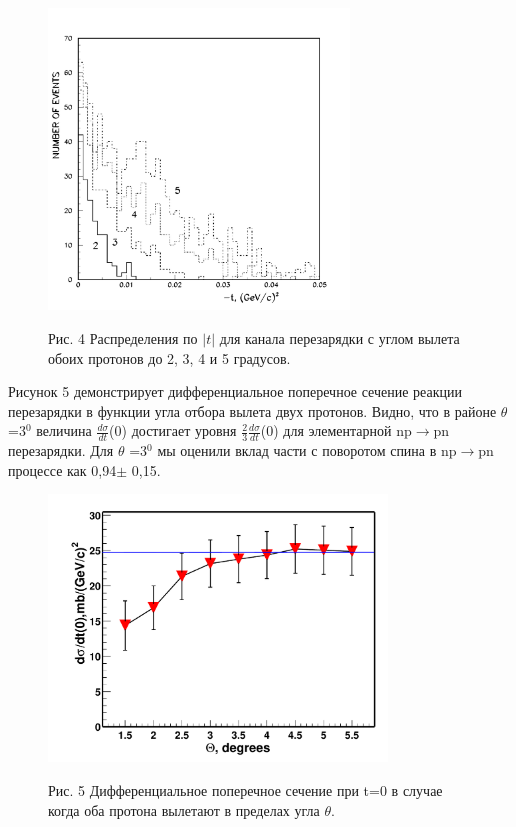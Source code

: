 \documentclass[a4paper,12pt]{article}
\begin{document}
{{        %
        \begin{figure}[hbt]
          \begin{center}
            \includegraphics[width=8cm]{tpp2345.pdf}
          \end{center}
          \vspace{0.4mm}
          Рис. 4 Распределения по $\vert t\vert$ для канала перезарядки
          с углом вылета обоих протонов до 2, 3, 4 и 5 градусов. \\
        \end{figure}

        Рисунок 5 демонстрирует дифференциальное поперечное сечение реак\-ции
        перезарядки в функции угла отбора вылета двух протонов.
        Видно, что в районе $\theta$ =3$^0$ величина
        $\frac{d\sigma}{dt}$(0)
        достигает уровня $\frac{2}{3}\frac{d\sigma}{dt}$(0)
        для элемен\-тарной np$\to$pn перезарядки. Для $\theta$ =3$^0$
        мы оценили вклад части с поворотом спина в np$\to$pn процессе
        как 0,94$\pm$ 0,15.

        \begin{figure}[hbt]
          \begin{center}
            \includegraphics[width=9cm]{sigma0.pdf}
          \end{center}
          \vspace{0.4mm}
          Рис. 5 Дифференциальное поперечное сечение при t=0 в случае
          когда оба протона вылетают в пределах угла $\theta$. \\
        \end{figure}

}}
\end{document}
